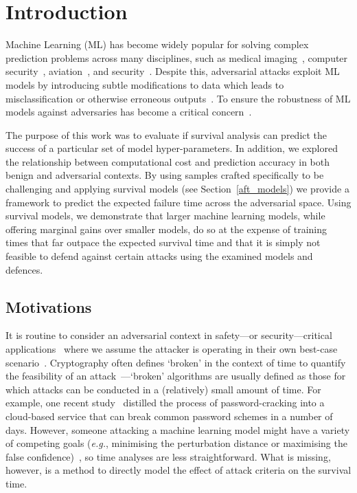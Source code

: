 \section{Introduction}

Machine Learning (ML) has become widely popular for solving complex prediction problems across many disciplines, such as medical imaging~\cite{ai_medical_imaging}, computer security~\cite{ai_security},
aviation~\cite{ai_aviation}, and security~\cite{ai_luggage}. Despite this, adversarial attacks exploit ML models by introducing subtle modifications to data which leads to misclassification or otherwise erroneous outputs~\cite{chakraborty_adversarial_2018}. To ensure the robustness of ML models against adversaries has become a critical concern~\cite{adversarialpatch,carlini_towards_2017,hopskipjump,art2018,meyers}.

The purpose of this work was to evaluate if survival analysis can predict the success of a particular set of model hyper-parameters. In addition, we explored the relationship between computational cost and prediction accuracy in both benign and adversarial contexts.  By using samples crafted specifically to be challenging and applying survival models (see Section~\ref{aft_models}) we provide a framework to predict the expected failure time across the adversarial space. Using survival models, we demonstrate that larger machine learning models, while offering marginal gains over smaller models, do so at the expense of training times that far outpace the expected survival time and that it is simply not feasible to defend against certain attacks using the examined models and defences.



\subsection{Motivations}

It is routine to consider an adversarial context in safety---or security---critical applications~\cite{ai_medical_imaging,ai_security,ai_luggage} where we assume the attacker is operating in their own best-case scenario~\cite{leurent2020sha,kamal2017study,madry2017towards,pixelattack,deepfool}.
Cryptography often defines `broken' in the context of time to quantify the feasibility of an attack~\cite{leurent2020sha}---`broken' algorithms are usually defined as those for which attacks can be conducted in a (relatively) small amount of time. For example, one recent study~\cite{kamal2017study} distilled the process of password-cracking into a cloud-based service that can break common password schemes in a number of days. However, someone attacking a machine learning model might have a variety of competing goals (\textit{e.g.}, minimising the perturbation distance or maximising the false confidence)~\cite{madry2017towards,hopskipjump,pixelattack,fgm,deepfool}, so time analyses are less straightforward.
What is missing, however, is a method to directly model the effect of attack criteria on the survival time.

